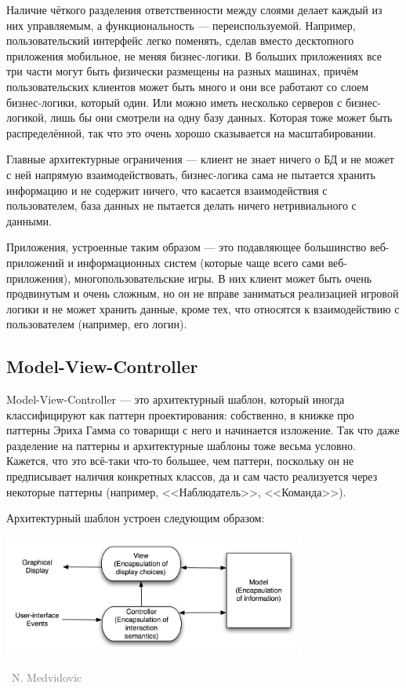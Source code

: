 \documentclass[a5paper]{article}
\newcommand{\attribution}[1] {
    \vspace{-4mm}\begin{flushright}\begin{scriptsize}\textcolor{gray}
    {\textcopyright\, #1}\end{scriptsize}\end{flushright}
}
\begin{document}
Наличие чёткого разделения ответственности между слоями делает каждый из них управляемым, а функциональность --- переиспользуемой. Например, пользовательский интерфейс легко поменять, сделав вместо десктопного приложения мобильное, не меняя бизнес-логики. В больших приложениях все три части могут быть физически размещены на разных машинах, причём пользовательских клиентов может быть много и они все работают со слоем бизнес-логики, который один. Или можно иметь несколько серверов с бизнес-логикой, лишь бы они смотрели на одну базу данных. Которая тоже может быть распределённой, так что это очень хорошо сказывается на масштабировании. 

Главные архитектурные ограничения --- клиент не знает ничего о БД и не может с ней напрямую взаимодействовать, бизнес-логика сама не пытается хранить информацию и не содержит ничего, что касается взаимодействия с пользователем, база данных не пытается делать ничего нетривиального с данными. 

Приложения, устроенные таким образом --- это подавляющее большинство веб-приложений и информационных систем (которые чаще всего сами веб-приложения), многопользовательские игры. В них клиент может быть очень продвинутым и очень сложным, но он не вправе заниматься реализацией игровой логики и не может хранить данные, кроме тех, что относятся к взаимодействию с пользователем (например, его логин).

\subsection{Model-View-Controller}

Model-View-Controller --- это архитектурный шаблон, который иногда классифицируют как паттерн проектирования: собственно, в книжке про паттерны Эриха Гамма со товарищи с него и начинается изложение. Так что даже разделение на паттерны и архитектурные шаблоны тоже весьма условно. Кажется, что это всё-таки что-то большее, чем паттерн, поскольку он не предписывает наличия конкретных классов, да и сам часто реализуется через некоторые паттерны (например, <<Наблюдатель>>, <<Команда>>).

Архитектурный шаблон устроен следующим образом:

\begin{center}
    \includegraphics[width=0.75\textwidth]{mvc.png}
    \attribution{N. Medvidovic}
\end{center}
\end{document}

